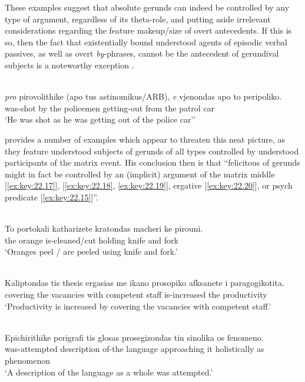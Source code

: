 \documentclass[output=paper]{langsci/langscibook}
\begin{document}
These examples suggest that absolute gerunds can indeed be controlled by any
type of argument, regardless of its theta-role, and putting aside irrelevant
considerations regarding the feature makeup/size of overt antecedents. If this
is so, then the fact that existentially bound understood agents of episodic
verbal passives, as well as
overt \emph{by}-phrases, cannot be the antecedent of gerundival subjects is a
noteworthy exception .

\ea%
    \label{ex:key:22.16} \\
    \gll    \emph{pro} pirovolithike (apo tus astinomikus/ARB), \emph{e} vjenondas  apo  to peripoliko.\\
    {}  was-shot          \hphantom{(}by   the policemen {} getting-out from the {patrol car}\\
    \glt    \enquote*{He was shot as he was getting out of the police car'}
\z

\citet{Kotzoglou2016} provides a number of examples which appear to threaten
this neat picture, as they feature understood subjects of gerunds of all types
controlled by understood participants of the matrix event. His conclusion then
is that “felicitous  of  gerunds might in fact be controlled
by an (implicit) argument of the matrix middle [\eqref{ex:key:22.17}],
 [\eqref{ex:key:22.18}, \eqref{ex:key:22.19}], ergative
[\eqref{ex:key:22.20}], or psych predicate [\eqref{ex:key:22.15}]”.

\ea%
\label{ex:key:22.17} \\
    \gll    To    portokali  katharizete  kratondas   macheri ke      pirouni.\\
    the  orange    is-cleaned/cut  holding  knife    and   fork\\
    \glt    \enquote*{Oranges peel / are peeled using knife and fork.}
\z

\ea%
    \label{ex:key:22.18} \\
    \gll    Kaliptondas tis    {thesis ergasias} me     ikano             prosopiko afksanete      i   paragogikotita.\\
            covering     the  vacancies            with competent  staff is-increased the   productivity\\
    \glt    \enquote*{Productivity is increased by covering the vacancies with competent staff.}
\z

\ea%
    \label{ex:key:22.19} \\
    \gll    Epichirithike  perigrafi  tis  glosas    prosegizondas  tin sinolika   os  fenomeno.\\
            was-attempted  description  of-the  language  approaching  it holistically   as  phenomenon\\
    \glt    \enquote*{A description of the language as a whole was attempted.}
\z
\end{document}

